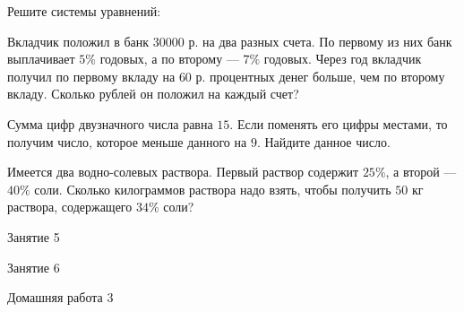 \begin{homework}[number=2]
	\begin{listofex}
		\item Решите системы уравнений:
		\begin{itasks}[2]
			\task {}
			\task {}
			\task {}
			\task {}
		\end{itasks}
		\item Вкладчик положил в банк \( 30000 \) р. на два разных счета. По первому из них банк выплачивает \( 5\% \) годовых, а по второму --- \( 7\% \) годовых. Через год вкладчик получил по первому вкладу на \( 60 \) р. процентных денег больше, чем по второму вкладу. Сколько рублей он положил на каждый счет?
		\item Сумма цифр двузначного числа равна \( 15 \). Если поменять его цифры местами, то получим число, которое меньше данного на \( 9 \). Найдите данное число.
		\item Имеется два водно-солевых раствора. Первый раствор содержит \( 25\% \), а	второй --- \( 40\% \) соли. Сколько килограммов раствора надо взять, чтобы получить \( 50 \) кг раствора, содержащего \( 34\% \) соли?
	\end{listofex}
\end{homework}

\begin{class}[number=5]
	\begin{listofex}
		\item Занятие 5
	\end{listofex}
\end{class}

\begin{class}[number=6]
	\begin{listofex}
		\item Занятие 6
	\end{listofex}
\end{class}

\begin{homework}[number=3]
	\begin{listofex}
		\item Домашняя работа 3
	\end{listofex}
\end{homework}

